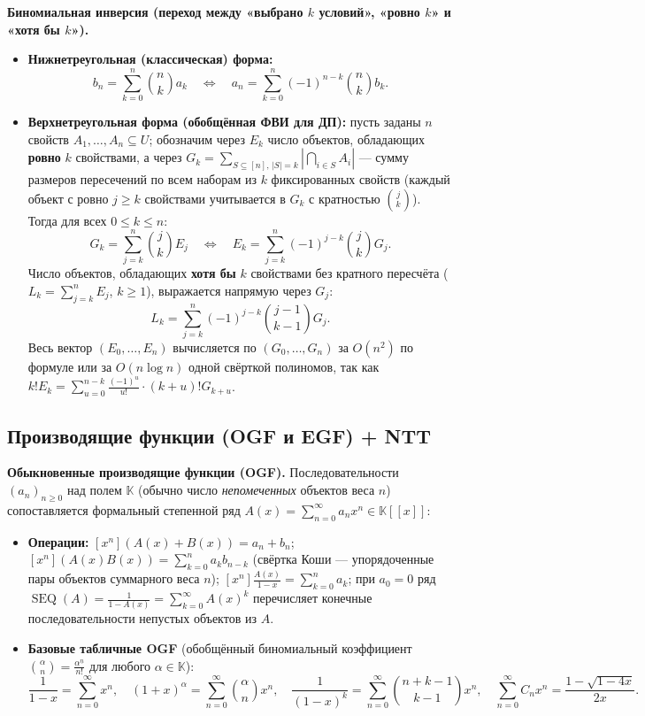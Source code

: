 \documentclass[10pt,a4paper]{article}
\renewcommand{\le}{\leqslant}
\renewcommand{\ge}{\geqslant}
\newcommand{\K}{\mathbb{K}}
\newcommand{\fall}[2]{#1^{\underline{#2}}}
\begin{document}
\textbf{Биномиальная инверсия (переход между «выбрано $k$ условий», «ровно $k$» и «хотя бы $k$»).}
\begin{itemize}
  \item \textbf{Нижнетреугольная (классическая) форма:}
  \[
    b_n = \sum_{k=0}^{n} \binom{n}{k} a_k \quad \Longleftrightarrow \quad a_n = \sum_{k=0}^{n} (-1)^{n - k} \binom{n}{k} b_k.
  \]
  \item \textbf{Верхнетреугольная форма (обобщённая ФВИ для ДП):} пусть заданы $n$ свойств $A_1, \dots, A_n \subseteq U$; обозначим через $E_k$ число объектов, обладающих \textbf{ровно} $k$ свойствами, а через $G_k = \sum_{S \subseteq [n],\, |S| = k} \left|\bigcap_{i \in S} A_i\right|$ — сумму размеров пересечений по всем наборам из $k$ фиксированных свойств (каждый объект с ровно $j \ge k$ свойствами учитывается в $G_k$ с кратностью $\binom{j}{k}$). Тогда для всех $0 \le k \le n$:
  \[
    G_k = \sum_{j=k}^{n} \binom{j}{k} E_j \quad \Longleftrightarrow \quad
    E_k = \sum_{j=k}^{n} (-1)^{j - k} \binom{j}{k} G_j.
  \]
  Число объектов, обладающих \textbf{хотя бы} $k$ свойствами без кратного пересчёта ($L_k = \sum_{j=k}^n E_j$, $k \ge 1$), выражается напрямую через $G_j$:
  \[
    L_k = \sum_{j=k}^{n} (-1)^{j - k} \binom{j - 1}{k - 1} G_j.
  \]
  Весь вектор $(E_0, \dots, E_n)$ вычисляется по $(G_0, \dots, G_n)$ за $O(n^2)$ по формуле или за $O(n \log n)$ одной свёрткой полиномов, так как $k! E_k = \sum_{u=0}^{n - k} \frac{(-1)^u}{u!} \cdot (k + u)! G_{k + u}$.
\end{itemize}

\subsection{Производящие функции (OGF и EGF) + NTT}

\textbf{Обыкновенные производящие функции (OGF).} Последовательности $(a_n)_{n \ge 0}$ над полем $\K$ (обычно число \emph{непомеченных} объектов веса $n$) сопоставляется формальный степенной ряд $A(x) = \sum_{n=0}^\infty a_n x^n \in \K[[x]]$:
\begin{itemize}
  \item \textbf{Операции:} $[x^n](A(x) + B(x)) = a_n + b_n$; $[x^n](A(x)B(x)) = \sum_{k=0}^n a_k b_{n - k}$ (свёртка Коши — упорядоченные пары объектов суммарного веса $n$); $[x^n]\frac{A(x)}{1 - x} = \sum_{k=0}^n a_k$; при $a_0 = 0$ ряд $\operatorname{SEQ}(A) = \frac{1}{1 - A(x)} = \sum_{k=0}^\infty A(x)^k$ перечисляет конечные последовательности непустых объектов из $A$.
  \item \textbf{Базовые табличные OGF} (обобщённый биномиальный коэффициент $\binom{\alpha}{n} = \frac{\fall{\alpha}{n}}{n!}$ для любого $\alpha \in \K$):
  \[
    \frac{1}{1 - x} = \sum_{n=0}^{\infty} x^n, \quad
    (1 + x)^\alpha = \sum_{n=0}^{\infty} \binom{\alpha}{n} x^n, \quad
    \frac{1}{(1 - x)^k} = \sum_{n=0}^{\infty} \binom{n + k - 1}{k - 1} x^n, \quad
    \sum_{n=0}^{\infty} C_n x^n = \frac{1 - \sqrt{1 - 4x}}{2x}.
  \]
\end{itemize}
\end{document}
